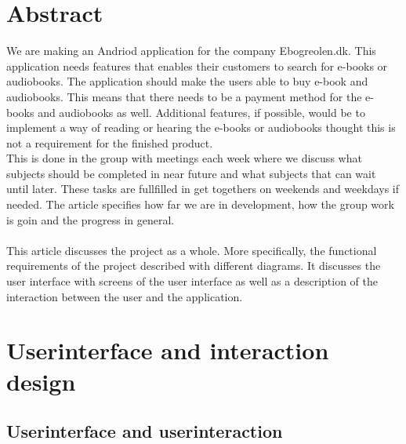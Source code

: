 \documentclass[12pt]{article}
\begin{document}
\section{Abstract}
We are making an Andriod application for the company Ebogreolen.dk. This application needs features that enables their customers to search for e-books or audiobooks. The application should make the users able to buy e-book and audiobooks. This means that there needs to be a payment method for the e-books and audiobooks as well. Additional features, if possible, would be to implement a way of reading or hearing the e-books or audiobooks thought this is not a requirement for the finished product.\\
This is done in the group with meetings each week where we discuss what subjects should be completed in near future and what subjects that can wait until later. These tasks are fullfilled in get togethers on weekends and weekdays if needed. The article specifies how far we are in development, how the group work is goin and the progress in general.\\
\\
This article discusses the project as a whole. More specifically, the functional requirements of the project described with different diagrams. It discusses the user interface with screens of the user interface as well as a description of the interaction between the user and the application.

\section{Userinterface and interaction design}
\subsection{Userinterface and userinteraction}
\end{document}
